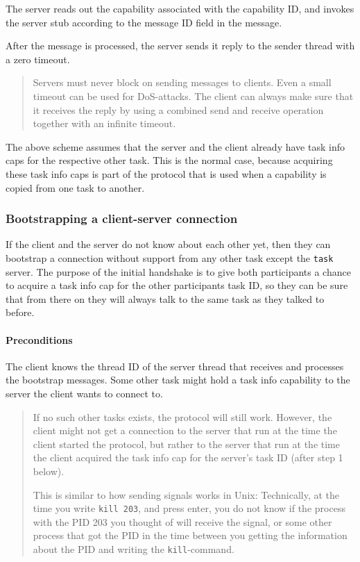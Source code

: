 \documentclass[9pt,a4paper]{extarticle}
\newenvironment{comment}{\footnotesize \begin{quote}}{\end{quote}}
\begin{document}
The server reads out the capability associated with the capability ID,
and invokes the server stub according to the message ID field in the
message.

After the message is processed, the server sends it reply to the
sender thread with a zero timeout.

\begin{comment}
  Servers must never block on sending messages to clients.  Even a
  small timeout can be used for DoS-attacks.  The client can always
  make sure that it receives the reply by using a combined send and
  receive operation together with an infinite timeout.
\end{comment}

The above scheme assumes that the server and the client already have
task info caps for the respective other task.  This is the normal
case, because acquiring these task info caps is part of the protocol
that is used when a capability is copied from one task to another.


\subsubsection{Bootstrapping a client-server connection}
\label{ipcbootstrap}

If the client and the server do not know about each other yet, then
they can bootstrap a connection without support from any other task
except the \texttt{task} server.  The purpose of the initial handshake
is to give both participants a chance to acquire a task info cap for
the other participants task ID, so they can be sure that from there on
they will always talk to the same task as they talked to before.

\paragraph{Preconditions}
The client knows the thread ID of the server thread that receives and
processes the bootstrap messages.  Some other task might hold a task
info capability to the server the client wants to connect to.

\begin{comment}
  If no such other tasks exists, the protocol will still work.
  However, the client might not get a connection to the server that
  run at the time the client started the protocol, but rather to the
  server that run at the time the client acquired the task info cap
  for the server's task ID (after step 1 below).
 
  This is similar to how sending signals works in Unix: Technically,
  at the time you write \texttt{kill 203}, and press enter, you do not
  know if the process with the PID 203 you thought of will receive the
  signal, or some other process that got the PID in the time between
  you getting the information about the PID and writing the
  \texttt{kill}-command.
\end{comment}
\end{document}
